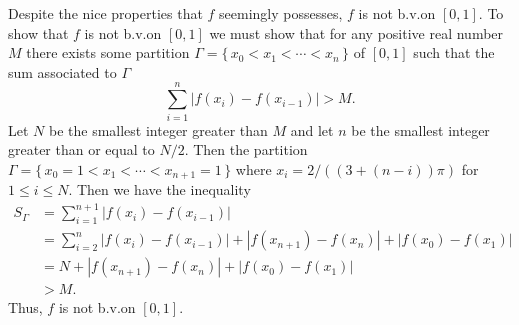 \begin{solution}
  Despite the nice properties that $f$ seemingly possesses, $f$ is not
  b.v.\@ on $[0,1]$. To show that $f$ is not b.v.\@ on $[0,1]$ we must show
  that for any positive real number $M$ there exists some partition
  $\Gamma=\{\,x_0<x_1<\cdots<x_n\,\}$ of $[0,1]$ such that the sum
  associated to $\Gamma$
  \[
    \sum_{i=1}^n|f(x_i)-f(x_{i-1})|>M.
  \]
  Let $N$ be the smallest integer greater than $M$ and let $n$ be the
  smallest integer greater than or equal to $N/2$. Then the partition
  $\Gamma=\{\,x_0=1<x_1<\cdots<x_{n+1}=1\,\}$ where
  $x_i=2/((3+(n-i))\pi)$ for $1\leq i\leq N$. Then we have
  the inequality
  \begin{align*}
    S_\Gamma
    &=\sum_{i=1}^{n+1}|f(x_i)-f(x_{i-1})|\\
    &=\sum_{i=2}^n
      |f(x_i)-f(x_{i-1})|+|f(x_{n+1})-f(x_n)|+|f(x_0)-f(x_1)|\\
    &=N+|f(x_{n+1})-f(x_n)|+|f(x_0)-f(x_1)|\\
    &>M.
  \end{align*}
  Thus, $f$ is not b.v.\@ on $[0,1]$.
\end{solution}

